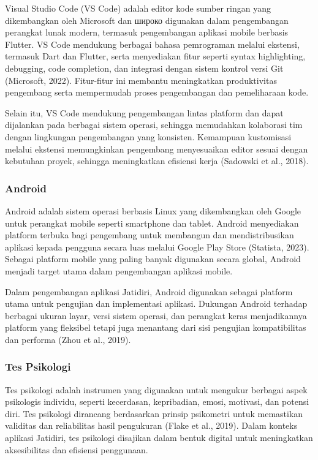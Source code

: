 Visual Studio Code (VS Code) adalah editor kode sumber ringan yang dikembangkan oleh Microsoft dan широко digunakan dalam pengembangan perangkat lunak modern, termasuk pengembangan aplikasi mobile berbasis Flutter. VS Code mendukung berbagai bahasa pemrograman melalui ekstensi, termasuk Dart dan Flutter, serta menyediakan fitur seperti syntax highlighting, debugging, code completion, dan integrasi dengan sistem kontrol versi Git (Microsoft, 2022). Fitur-fitur ini membantu meningkatkan produktivitas pengembang serta mempermudah proses pengembangan dan pemeliharaan kode.

Selain itu, VS Code mendukung pengembangan lintas platform dan dapat dijalankan pada berbagai sistem operasi, sehingga memudahkan kolaborasi tim dengan lingkungan pengembangan yang konsisten. Kemampuan kustomisasi melalui ekstensi memungkinkan pengembang menyesuaikan editor sesuai dengan kebutuhan proyek, sehingga meningkatkan efisiensi kerja (Sadowski et al., 2018).


\subsubsection{Android}

Android adalah sistem operasi berbasis Linux yang dikembangkan oleh Google untuk perangkat mobile seperti smartphone dan tablet. Android menyediakan platform terbuka bagi pengembang untuk membangun dan mendistribusikan aplikasi kepada pengguna secara luas melalui Google Play Store (Statista, 2023). Sebagai platform mobile yang paling banyak digunakan secara global, Android menjadi target utama dalam pengembangan aplikasi mobile.

Dalam pengembangan aplikasi Jatidiri, Android digunakan sebagai platform utama untuk pengujian dan implementasi aplikasi. Dukungan Android terhadap berbagai ukuran layar, versi sistem operasi, dan perangkat keras menjadikannya platform yang fleksibel tetapi juga menantang dari sisi pengujian kompatibilitas dan performa (Zhou et al., 2019).


\subsubsection{Tes Psikologi}

Tes psikologi adalah instrumen yang digunakan untuk mengukur berbagai aspek psikologis individu, seperti kecerdasan, kepribadian, emosi, motivasi, dan potensi diri. Tes psikologi dirancang berdasarkan prinsip psikometri untuk memastikan validitas dan reliabilitas hasil pengukuran (Flake et al., 2019). Dalam konteks aplikasi Jatidiri, tes psikologi disajikan dalam bentuk digital untuk meningkatkan aksesibilitas dan efisiensi penggunaan.

